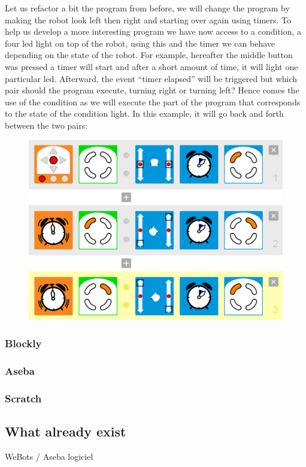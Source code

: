 \documentclass{scrartcl}
\begin{document}
Let us refactor a bit the program from before, we will change the program by making the robot look left then right and starting over again using timers. 
To help us develop a more interesting program we have now access to a condition, a four led light on top of the robot, using this and the timer we can behave depending on the state of the robot. 
For example, hereafter the middle button was pressed a timer will start and after a short amount of time, it will light one particular led. Afterward, the event “timer elapsed” will be triggered but which pair should the program execute, 
turning right or turning left? Hence comes the use of the condition as we will execute the part of the program that corresponds to the state of the condition light. In this example, it will go back and forth between the two pairs: 
\begin{figure}[h!]
  \includegraphics[width=\textwidth]{./VPL/middlebtn_3E_adv}
  \label{fig:thymio_vpl_middlebtn_3e9a}
\end{figure}

\subsubsection{Blockly}
\subsubsection{Aseba}
\subsubsection{Scratch}
\subsection{What already exist} 
WeBots / Aseba logiciel
\end{document}
